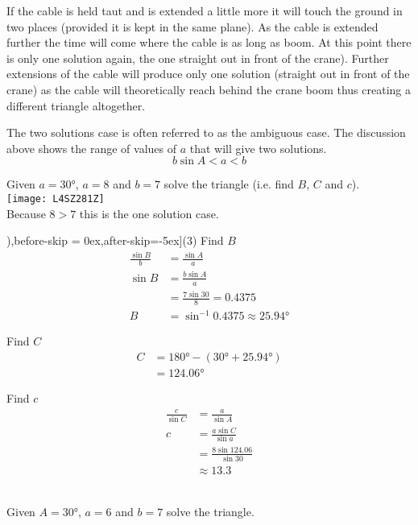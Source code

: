 If the cable is held taut and is extended a little more it will touch the ground in two places (provided it is kept in the same plane). As the cable is extended further the time will come where the cable is as long as boom. At this point there is only one solution again, the one straight out in front of the crane). Further extensions of the cable will produce only one solution (straight out in front of the crane) as the cable will theoretically reach behind the crane boom thus creating a different triangle altogether. 

The two solutions case is often referred to as the ambiguous case. The discussion above shows the range of values of $a$ that will give two solutions.
\begin{equation*}b \sin  A <a <b
\end{equation*}

\example Given $a =\ang{30} $, $a =8$ and $b =7$ solve the triangle (i.e. find $B$, $C$ and $c$). \\
\texttt{[image: L4SZ281Z]}\\
Because $8 >7$ this is the one solution case. \\
\solution
\begin{tasks}[counter-format=(tsk[1]),before-skip = {0ex},after-skip={-5ex}](3)
\task Find $B$
\begin{align*}\frac{\sin  B}{b} &  = \frac{\sin  A}{a} \\
\sin  B &  = \frac{b \sin  A}{a} \\
&  = \frac{7 \sin  30 }{8} =0.4375 \\
B &  = \sin ^{ -1} 0.4375 \approx \ang{25.94} \end{align*}

\task Find $C$
\begin{align*}C &  = \ang{180}  -(\ang{30}  +\ang{25.94} ) \\
&  = \ang{124.06} \end{align*}

\task Find $c$
\begin{align*}\frac{c}{\sin  C} &  = \frac{a}{\sin  A} \\
c &  = \frac{a \sin  C}{\sin a} \\
&  = \frac{8 \sin  124.06 }{\sin  30 } \\
&  \approx   13.3\end{align*}
\end{tasks}
 \\
Given $A =\ang{30} $, $a =6$ and $b =7$ solve the triangle. 


